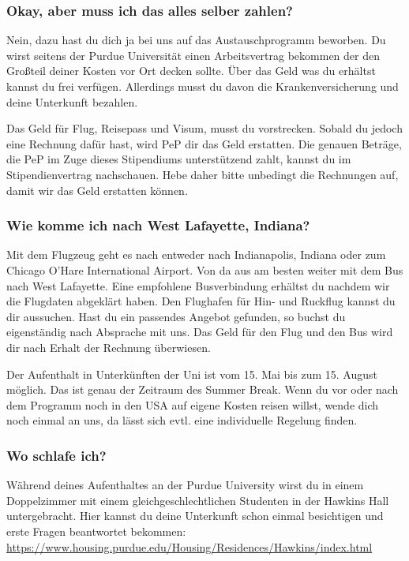 \documentclass[
  paper=a4,
  fontsize=12pt,
  DIV=16,
  headheight=52pt,
  footheight=45pt,
  headinclude,
  parskip=full,
]{scrartcl}
\begin{document}
\subsubsection*{Okay, aber muss ich das alles selber zahlen?}
Nein, dazu hast du dich ja bei uns auf das Austauschprogramm beworben.
Du wirst seitens der Purdue Universität einen Arbeitsvertrag bekommen der den Großteil deiner Kosten vor Ort decken sollte.
Über das Geld was du erhältst kannst du frei verfügen.
Allerdings musst du davon die Krankenversicherung und deine Unterkunft bezahlen.

Das Geld für Flug, Reisepass und Visum, musst du vorstrecken.
Sobald du jedoch eine Rechnung dafür hast, wird PeP dir das Geld erstatten.
Die genauen Beträge, die PeP im Zuge dieses Stipendiums unterstützend zahlt, kannst du im Stipendienvertrag nachschauen.
Hebe daher bitte unbedingt die Rechnungen auf, damit wir das Geld erstatten können.

\subsubsection*{Wie komme ich nach West Lafayette, Indiana?}
Mit dem Flugzeug geht es nach entweder nach Indianapolis, Indiana oder zum
Chicago O'Hare International Airport.
Von da aus am besten weiter mit dem Bus nach West Lafayette.
Eine empfohlene Busverbindung erhältst du nachdem wir die Flugdaten abgeklärt
haben.
Den Flughafen für Hin- und Ruckflug kannst du dir aussuchen.
Hast du ein passendes Angebot gefunden, so buchst du eigenständig nach Absprache mit uns.
Das Geld für den Flug und den Bus wird dir nach Erhalt der Rechnung überwiesen.

Der Aufenthalt in Unterkünften der Uni ist vom 15. Mai bis zum 15. August
möglich. Das ist genau der Zeitraum des Summer Break. Wenn du vor oder nach dem
Programm noch in den USA auf eigene Kosten reisen willst, wende dich noch einmal an uns, da lässt sich evtl. eine individuelle Regelung finden.


\subsubsection*{Wo schlafe ich?}
Während deines Aufenthaltes an der Purdue University wirst du in einem Doppelzimmer mit einem gleichgeschlechtlichen Studenten in der Hawkins Hall untergebracht.
Hier kannst du deine Unterkunft schon einmal besichtigen und erste Fragen beantwortet bekommen: \url{https://www.housing.purdue.edu/Housing/Residences/Hawkins/index.html}
\end{document}
